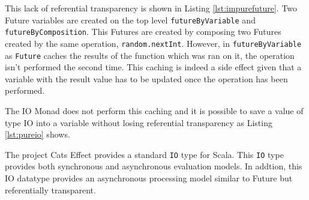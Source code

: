 \documentclass[../main.tex]{subfiles}
\begin{document}


This lack of referential transparency is shown in Listing \ref{lst:impurefuture}. Two
Future variables are created on the top level \texttt{futureByVariable} and
\texttt{futureByComposition}. This Futures are created by composing two Futures
created by the same operation, \texttt{random.nextInt}. However, in
\texttt{futureByVariable} as \texttt{Future} caches the results of the function
which was ran on it, the operation isn't performed the second time. This caching
is indeed a side effect given that a variable with the result value has to
be updated once the operation has been performed.

The IO Monad does not perform this caching and it is possible to save a value of type IO into a
variable without losing referential transparency as Listing \ref{lst:pureio} shows.

The project Cats Effect \autocite{CatsHome} provides a standard \texttt{IO} type for
Scala. This \texttt{IO} type provides both synchronous and asynchronous evaluation
models. In addtion, this IO datatype provides an asynchronous processing model similar to
Future but referentially transparent.


\end{document}
